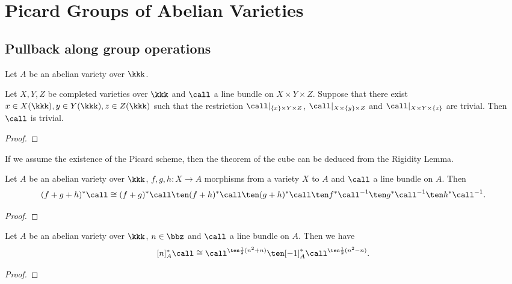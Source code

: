 \section{Picard Groups of Abelian Varieties}

\subsection{Pullback along group operations}

    \begin{theorem}\label{thm: seesaw theorem}
        Let \(A\) be an abelian variety over \(\kkk\). 
        
    \end{theorem}

    \begin{theorem}\label{thm: theorem of the cube}
        Let \(X,Y,Z\) be completed varieties over \(\kkk\) and \(\call\) a line bundle on \(X \times Y \times Z\). 
        Suppose that there exist \(x \in X(\kkk), y \in Y(\kkk), z \in Z(\kkk)\) such that the restriction \(\call|_{\{x\} \times Y \times Z}\), \(\call|_{X \times \{y\} \times Z}\) and \(\call|_{X \times Y \times \{z\}}\) are trivial. 
        Then \(\call\) is trivial.
    \end{theorem}
    \begin{proof}
    \end{proof}

    \begin{remark}\label{rmk: theorem of the cube by rigidity lemma and picard scheme}
        If we assume the existence of the Picard scheme, then the theorem of the cube can be deduced from the Rigidity Lemma.
    \end{remark}

    \begin{proposition}
        Let \(A\) be an abelian variety over \(\kkk\), \(f,g,h: X \to A\) morphisms from a variety \(X\) to \(A\) and \(\call\) a line bundle on \(A\).
        Then 
        \[ (f+g+h)^*\call \cong (f+g)^*\call \ten (f+h)^*\call \ten (g+h)^*\call \ten f^*\call^{-1} \ten g^*\call^{-1} \ten h^*\call^{-1}. \]
    \end{proposition}
    \begin{proof}
    \end{proof}

    \begin{proposition}\label{prop: pull back of line bundles along the multiplication by n}
        Let \(A\) be an abelian variety over \(\kkk\), \(n\in \bbz\) and \(\call\) a line bundle on \(A\). 
        Then we have 
        \[ [n]_A^*\call \cong \call^{\ten \frac{1}{2}(n^2+n)} \ten [-1]_A^*\call^{\ten \frac{1}{2}(n^2-n)}. \]
    \end{proposition}
    \begin{proof}
    \end{proof}

